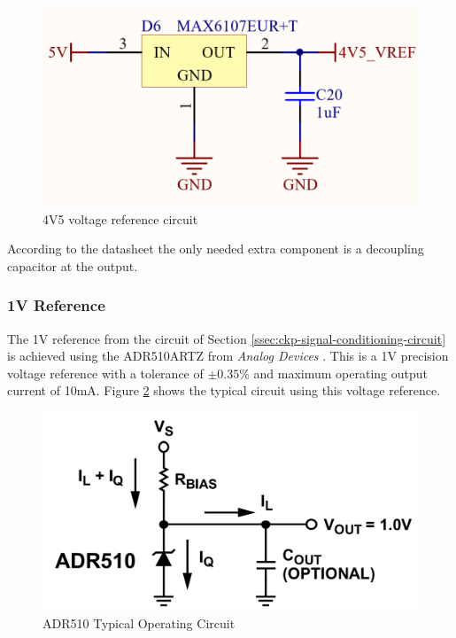 			\begin{figure}[htbp]
				\centering
					\includegraphics[scale=0.4]{figuras/fig-MAX6107EUR+T-circuit.png}
				\caption{4V5 voltage reference circuit \cite{MAX6107EUR+T-circuit}}
				\label{fig:max6107eur+t-circuit}
			\end{figure}

			According to the datasheet the only needed extra component is a decoupling capacitor at the output.

		\subsubsection{1V Reference}\label{sssec:1v-reference}

			The 1V reference from the circuit of Section \ref{ssec:ckp-signal-conditioning-circuit} is achieved using the ADR510ARTZ from \textit{Analog Devices} \cite{adr510artz-datasheet}. This is a 1V precision voltage reference with a tolerance of $\pm 0.35\%$ and maximum operating output current of 10mA. Figure \ref{fig:adr510-typical-circuit} shows the typical circuit using this voltage reference.

			\begin{figure}[htbp]
				\centering
					\includegraphics[scale=0.4]{figuras/fig-adr510-typical-circuit.png}
				\caption{ADR510 Typical Operating Circuit \cite{adr510-typical-circuit}}
				\label{fig:adr510-typical-circuit}
			\end{figure}

